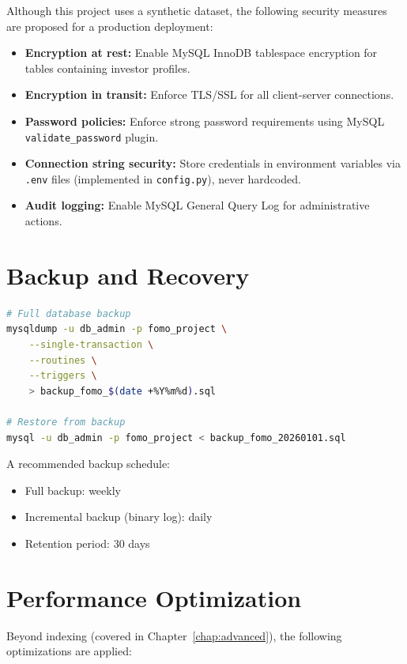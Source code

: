 Although this project uses a synthetic dataset, the following security measures are proposed for a production deployment:

\begin{itemize}
    \item \textbf{Encryption at rest:} Enable MySQL InnoDB tablespace encryption for tables containing investor profiles.
    \item \textbf{Encryption in transit:} Enforce TLS/SSL for all client-server connections.
    \item \textbf{Password policies:} Enforce strong password requirements using MySQL \texttt{validate\_password} plugin.
    \item \textbf{Connection string security:} Store credentials in environment variables via \texttt{.env} files (implemented in \texttt{config.py}), never hardcoded.
    \item \textbf{Audit logging:} Enable MySQL General Query Log for administrative actions.
\end{itemize}

\section{Backup and Recovery}

\begin{lstlisting}[language=bash, caption={Backup Procedure using mysqldump}]
# Full database backup
mysqldump -u db_admin -p fomo_project \
    --single-transaction \
    --routines \
    --triggers \
    > backup_fomo_$(date +%Y%m%d).sql

# Restore from backup
mysql -u db_admin -p fomo_project < backup_fomo_20260101.sql
\end{lstlisting}

A recommended backup schedule:
\begin{itemize}
    \item Full backup: weekly
    \item Incremental backup (binary log): daily
    \item Retention period: 30 days
\end{itemize}

\section{Performance Optimization}

Beyond indexing (covered in Chapter~\ref{chap:advanced}), the following optimizations are applied:

